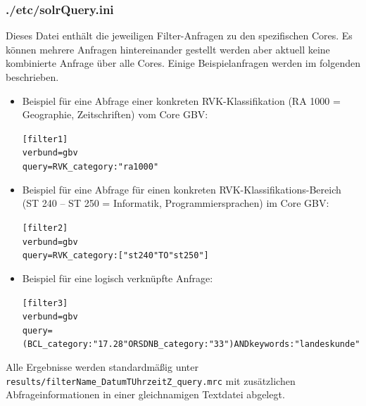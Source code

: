 \documentclass[10pt]{article}
\begin{document}
\subsubsection{./etc/solrQuery.ini}
Dieses Datei enthält die jeweiligen Filter-Anfragen zu den spezifischen Cores. Es können mehrere Anfragen hintereinander gestellt werden aber aktuell keine kombinierte Anfrage über alle Cores. Einige Beispielanfragen werden im folgenden beschrieben.
\begin{itemize}
	\item Beispiel für eine Abfrage einer konkreten RVK-Klassifikation (RA 1000 = Geographie, Zeitschriften) vom Core GBV:
		\begin{alltt}
			[filter1]
			verbund=gbv
			query=RVK_category:"ra 1000"
		\end{alltt}
	\item Beispiel für eine Abfrage für einen konkreten RVK-Klassifikations-Bereich (ST 240 – ST 250 = Informatik, Programmiersprachen) im Core GBV:
		\begin{alltt}
			[filter2]
			verbund=gbv
			query=RVK_category:["st 240" TO "st 250"]
		\end{alltt}
	\item Beispiel für eine logisch verknüpfte Anfrage: 
		\begin{alltt}
			[filter3]
			verbund=gbv
			query=(BCL_category:"17.28" OR SDNB_category:"33") AND 	keywords:"landeskunde"
		\end{alltt}
\end{itemize}
Alle Ergebnisse werden standardmäßig unter \texttt{results/filterName\_DatumTUhrzeitZ\_query.mrc} mit zusätzlichen Abfrageinformationen in einer gleichnamigen Textdatei abgelegt. 

\newpage
\end{document}
